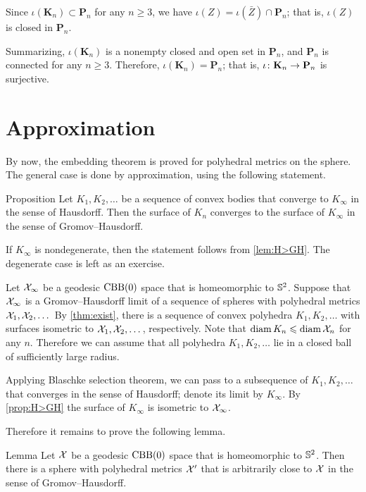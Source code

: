 Since $\iota(\mathbf{K}_n)\subset \mathbf{P}_n$ for any $n\ge 3$, we have $\iota (Z)=\iota(\bar Z)\cap \mathbf{P}_n$;
that is, $\iota (Z)$ is closed in $\mathbf{P}_n$. 

\medskip

Summarizing, $\iota(\mathbf{K}_n)$ is a nonempty closed and open set in $\mathbf{P}_n$, and $\mathbf{P}_n$ is connected for any $n\ge 3$.
Therefore, $\iota(\mathbf{K}_n)=\mathbf{P}_n$; that is, $\iota\:\mathbf{K}_n\z\to\mathbf{P}_n$ is surjective.
\qeds

\section{Approximation}

By now, the embedding theorem is proved for polyhedral metrics on the sphere.
The general case is done by approximation, using the following statement.

\begin{thm}{Proposition}\label{prop:H>GH}
Let $K_1,K_2,\dots$ be a sequence of convex bodies that converge to $K_\infty$ in the sense of Hausdorff.
Then the surface of $K_n$ converges to the surface of $K_\infty$ in the sense of Gromov--Hausdorff.
\end{thm}

If $K_\infty$ is nondegenerate, then the statement follows from \ref{lem:H>GH}.
The degenerate case is left as an exercise.

Let $\mathcal{X}_\infty$ be a geodesic $\mathrm{CBB}(0)$ space that is homeomorphic to $\mathbb{S}^2$.
Suppose that $\mathcal{X}_\infty$ is a Gromov--Hausdorff limit of a sequence of spheres with polyhedral metrics $\mathcal{X}_1,\mathcal{X}_2,\dots$
By \ref{thm:exist}, there is a sequence of convex polyhedra $K_1,K_2,\dots$ with surfaces isometric to $\mathcal{X}_1,\mathcal{X}_2,\dots$, respectively.
Note that  $\operatorname{\rm diam}\nolimits K_n\leqslant \operatorname{\rm diam}\nolimits \mathcal{X}_n$ for any $n$.
Therefore we can assume that all polyhedra $K_1,K_2,\dots$ lie in a closed ball of sufficiently large radius.

Applying Blaschke selection theorem, we can pass to a subsequence of $K_1,K_2,\dots$ that converges in the sense of Hausdorff; denote its limit by $K_\infty$.
By \ref{prop:H>GH} the surface of $K_\infty$ is isometric to $\mathcal{X}_\infty$.

Therefore it remains to prove the following lemma.

\begin{thm}{Lemma}\label{lem:GH-approximation}
Let $\mathcal{X}$ be a geodesic $\mathrm{CBB}(0)$ space that is homeomorphic to $\mathbb{S}^2$.
Then there is a sphere with polyhedral metrics $\mathcal{X}'$
that is arbitrarily close to $\mathcal{X}$ in the sense of Gromov--Hausdorff.
\end{thm}

